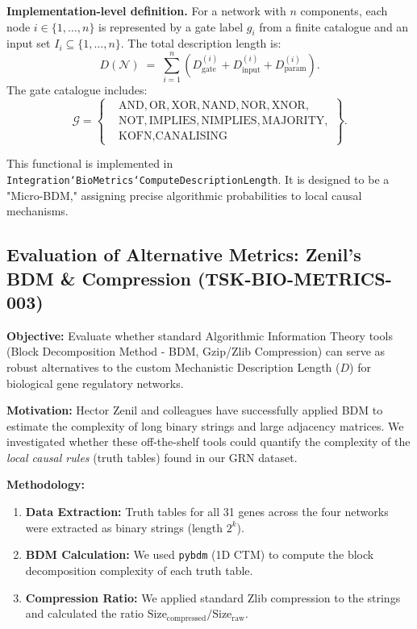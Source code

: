\documentclass{article}
\begin{document}
\textbf{Implementation-level definition.}
For a network with $n$ components, each node $i \in \{1,\dots,n\}$ is represented by a gate label $g_i$ from a finite catalogue and an input set $I_i \subseteq \{1,\dots,n\}$. The total description length is:
\[
D(\mathcal{N}) \;=\; \sum_{i=1}^{n} \left(D_{\text{gate}}^{(i)} + D_{\text{input}}^{(i)} + D_{\text{param}}^{(i)}\right).
\]
The gate catalogue includes:
\[
\mathcal{G} = \left\{
\begin{aligned}
&\text{AND}, \text{OR}, \text{XOR}, \text{NAND}, \text{NOR}, \text{XNOR}, \\
&\text{NOT}, \text{IMPLIES}, \text{NIMPLIES}, \text{MAJORITY}, \\
&\text{KOFN}, \text{CANALISING}
\end{aligned}
\right\}.
\]

This functional is implemented in \texttt{Integration`BioMetrics`ComputeDescriptionLength}. It is designed to be a "Micro-BDM," assigning precise algorithmic probabilities to local causal mechanisms.

\subsection{Evaluation of Alternative Metrics: Zenil's BDM \& Compression (TSK-BIO-METRICS-003)}
\textbf{Objective:} Evaluate whether standard Algorithmic Information Theory tools (Block Decomposition Method - BDM, Gzip/Zlib Compression) can serve as robust alternatives to the custom Mechanistic Description Length ($D$) for biological gene regulatory networks.

\textbf{Motivation:}
Hector Zenil and colleagues have successfully applied BDM to estimate the complexity of long binary strings and large adjacency matrices. We investigated whether these off-the-shelf tools could quantify the complexity of the \textit{local causal rules} (truth tables) found in our GRN dataset.

\textbf{Methodology:}
\begin{enumerate}
    \item \textbf{Data Extraction:} Truth tables for all 31 genes across the four networks were extracted as binary strings (length $2^k$).
    \item \textbf{BDM Calculation:} We used \texttt{pybdm} (1D CTM) to compute the block decomposition complexity of each truth table.
    \item \textbf{Compression Ratio:} We applied standard Zlib compression to the strings and calculated the ratio $\text{Size}_{\text{compressed}} / \text{Size}_{\text{raw}}$.
\end{enumerate}
\end{document}

